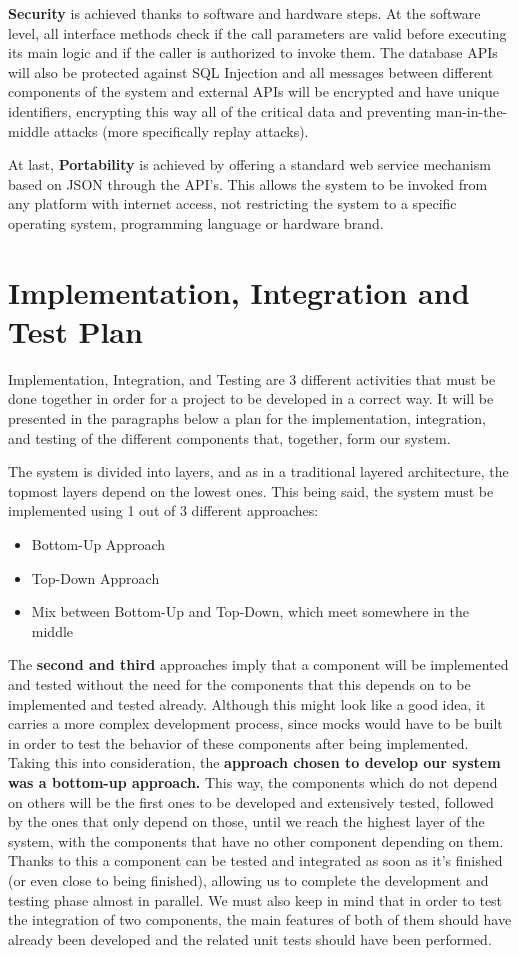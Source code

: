 \documentclass[12pt]{article}
\begin{document}
\textbf{Security} is achieved thanks to software and hardware steps. At the software level, all interface methods check if the call parameters are valid before executing its main logic and if the caller is authorized to invoke them. The database APIs will also be protected against SQL Injection and all messages between different components of the system and external APIs will be encrypted and have unique identifiers, encrypting this way all of the critical data and preventing man-in-the-middle attacks (more specifically replay attacks).

At last, \textbf{Portability} is achieved by offering a standard web service mechanism based on JSON through the API's. This allows the system to be invoked from any platform with internet access, not restricting the system to a specific operating system, programming language or hardware brand.

\section{Implementation, Integration and Test Plan}
Implementation, Integration, and Testing are 3 different activities that must be done together in order for a project to be developed in a correct way. It will be presented in the paragraphs below a plan for the implementation, integration, and testing of the different components that, together, form our system.


The system is divided into layers, and as in a traditional layered architecture, the topmost layers depend on the lowest ones. This being said, the system must be implemented using 1 out of 3 different approaches:
\begin{itemize}
    \item Bottom-Up Approach
    \item Top-Down Approach
    \item Mix between Bottom-Up and Top-Down, which meet somewhere in the middle
\end{itemize}

The \textbf{second and third} approaches imply that a component will be implemented and tested without the need for the components that this depends on to be implemented and tested already. Although this might look like a good idea, it carries a more complex development process, since mocks would have to be built in order to test the behavior of these components after being implemented.
Taking this into consideration, the \textbf{approach chosen to develop our system was a bottom-up approach.} This way, the components which do not depend on others will be the first ones to be developed and extensively tested, followed by the ones that only depend on those, until we reach the highest layer of the system, with the components that have no other component depending on them. Thanks to this a component can be tested and integrated as soon as it's finished (or even close to being finished), allowing us to complete the development and testing phase almost in parallel.
We must also keep in mind that in order to test the integration of two components, the main features of both of them should have already been developed and the related unit tests should have been performed. 
\end{document}
